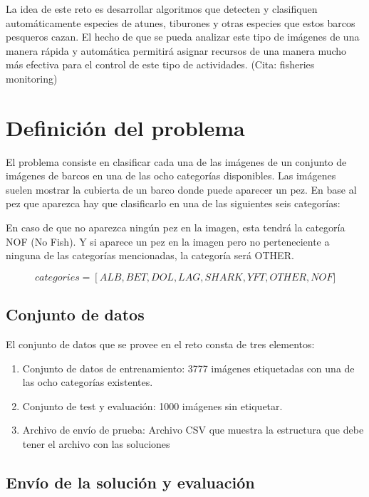 La idea de este reto es desarrollar algoritmos que detecten y clasifiquen automáticamente especies de atunes, tiburones y otras especies que estos barcos pesqueros cazan. El hecho de que se pueda analizar este tipo de imágenes de una manera rápida y automática permitirá asignar recursos de una manera mucho más efectiva para el control de este tipo de actividades. (Cita: fisheries monitoring)

\section{Definición del problema}

El problema consiste en clasificar cada una de las imágenes de un conjunto de imágenes de barcos en una de las ocho categorías disponibles. Las imágenes suelen mostrar la cubierta de un barco donde puede aparecer un pez. En base al pez que aparezca hay que clasificarlo en una de las siguientes seis categorías:

\begin{center}
\end{center}

En caso de que no aparezca ningún pez en la imagen, esta tendrá la categoría NOF (No Fish). Y si aparece un pez en la imagen pero no perteneciente a ninguna de las categorías mencionadas, la categoría será OTHER.

\[
  categories =
  \left[ALB, BET, DOL, LAG, SHARK, YFT, OTHER, NOF]
\]

\subsection{Conjunto de datos}

El conjunto de datos que se provee en el reto consta de tres elementos:

\begin{enumerate}
  \item{Conjunto de datos de entrenamiento: 3777 imágenes etiquetadas con una de las ocho categorías existentes.}
  \item{Conjunto de test y evaluación: 1000 imágenes sin etiquetar.}
  \item{Archivo de envío de prueba: Archivo CSV que muestra la estructura que debe tener el archivo con las soluciones}
\end{enumerate}

\subsection{Envío de la solución y evaluación}

